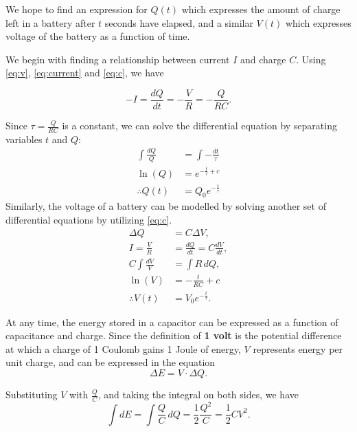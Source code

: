 \documentclass[10pt]{article}
\begin{document}
We hope to find an expression for $Q(t)$ which expresses the amount of charge left in a battery after $t$ seconds have elapsed, and a similar $V(t)$ which expresses voltage of the battery as a function of time.

We begin with finding a relationship between current $I$ and charge $C$. Using \eqref{eq:v}, \eqref{eq:current} and \eqref{eq:c}, we have

\begin{equation}
    -I = \frac{d Q}{d t} = -\frac{V}{R} = -\frac{Q}{RC}.
\end{equation}

Since $\tau = \displaystyle\frac{Q}{RC}$ is a constant, we can solve the differential equation by separating variables $t$ and $Q$:
\begin{align}
    \int \frac{dQ}{Q} & = \int-\frac{dt}{\tau} \\
    \ln (Q) & = e^{-\frac{t}{\tau} + c} \\
    \therefore Q(t) & = Q_0 e^{-\frac{t}{\tau}}
\end{align}
Similarly, the voltage of a battery can be modelled by solving another set of differential equations by utilizing \eqref{eq:c}.
\begin{align}
    \Delta Q & = C \Delta V,\\
    I = \frac{V}{R} & = \frac{dQ}{dt} = C\frac{dV}{dt},\\
    C\int \frac{dV}{V} & = \int R\, dQ,\\
    \ln (V) & = -\frac{t}{RC} + c \\
    \therefore V(t) & = V_0 e^{-\frac{t}{\tau}}.
\end{align}

At any time, the energy stored in a capacitor can be expressed as a function of capacitance and charge. Since the definition of \textbf{1 volt} is the potential difference at which a charge of 1 Coulomb gains 1 Joule of energy, $V$ represents energy per unit charge, and can be expressed in the equation
\begin{equation}
    \Delta E = V \cdot \Delta Q.
\end{equation}

Substituting $V$ with $\frac{Q}{C}$, and taking the integral on both sides, we have
\begin{equation}\label{eq:energy}
    \int dE = \int \frac{Q}{C}\, dQ = \frac{1}{2}\frac{Q^2}{C} = \frac{1}{2}CV^2.
\end{equation}
\end{document}
